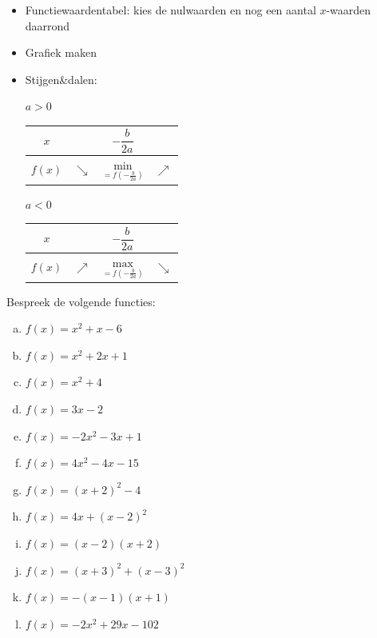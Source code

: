 \documentclass[12pt]{article}
\begin{document}
\begin{mdframed}
\begin{itemize}
  \item Functiewaardentabel: kies de nulwaarden en nog een aantal $x$-waarden daarrond
  \item Grafiek maken
  \item Stijgen\&dalen:\\
    \begin{minipage}{0.45\textwidth}
      \centering $a>0$\\
      \begin{tabular}{c|lcr}
        $x$ &  & $-\dfrac{b}{2a}$ & \\[0.1cm]
        \hline
        $f(x)$ & $\searrow$ & $\underset{=f(-\frac{b}{2a})}{\mbox{min}}$ & $\nearrow$
      \end{tabular}
    \end{minipage}
    \begin{minipage}{0.45\textwidth}
      \centering $a<0$\\
      \begin{tabular}{c|lcr}
        $x$ &  & $-\dfrac{b}{2a}$ & \\[0.1cm]
        \hline
        $f(x)$ & $\nearrow$ & $\underset{=f(-\frac{b}{2a})}{\mbox{max}}$ & $\searrow$
      \end{tabular}
    \end{minipage}
  \end{itemize}
\end{mdframed}



\begin{oefening}
  Bespreek de volgende functies:
  \begin{multicols}{2}
  \begin{enumerate}[(a)]
  \item $f(x)=x^2+x-6$
  \item $f(x)=x^2+2x+1$
  \item $f(x)=x^2+4$
  \item $f(x)=3x-2$
  \item $f(x)=-2x^2-3x+1$
  \item $f(x)=4x^2-4x-15$
  \item $f(x)=(x+2)^2-4$
  \item $f(x)=4x+(x-2)^2$
  \item $f(x)=(x-2)(x+2)$
  \item $f(x)=(x+3)^2+(x-3)^2$
  \item $f(x)=-(x-1)(x+1)$
  \item $f(x)=-2x^2+29x-102$
  \end{enumerate}
  \end{multicols}
\end{oefening}
\end{document}
